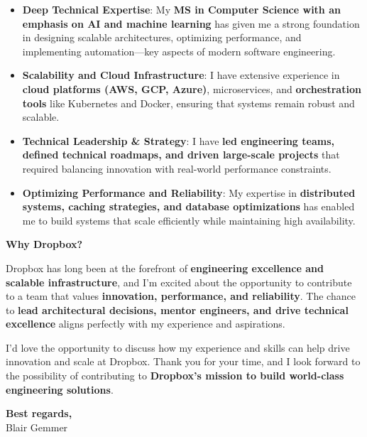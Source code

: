 \documentclass[a4paper,10.5pt]{article}
\newcommand{\applicantName}{Blair Gemmer}
\newcommand{\companyName}{Dropbox}
\begin{document}
\begin{itemize}
    \item \textbf{Deep Technical Expertise}: My \textbf{MS in Computer Science with an emphasis on AI and machine learning} has given me a strong foundation in designing scalable architectures, optimizing performance, and implementing automation—key aspects of modern software engineering.
    \item \textbf{Scalability and Cloud Infrastructure}: I have extensive experience in \textbf{cloud platforms (AWS, GCP, Azure)}, microservices, and \textbf{orchestration tools} like Kubernetes and Docker, ensuring that systems remain robust and scalable.
    \item \textbf{Technical Leadership \& Strategy}: I have \textbf{led engineering teams, defined technical roadmaps, and driven large-scale projects} that required balancing innovation with real-world performance constraints.
    \item \textbf{Optimizing Performance and Reliability}: My expertise in \textbf{distributed systems, caching strategies, and database optimizations} has enabled me to build systems that scale efficiently while maintaining high availability.
\end{itemize}

\vspace{0.5cm}

\noindent
\textbf{Why \companyName?}

\companyName{} has long been at the forefront of \textbf{engineering excellence and scalable infrastructure}, and I’m excited about the opportunity to contribute to a team that values \textbf{innovation, performance, and reliability}. The chance to \textbf{lead architectural decisions, mentor engineers, and drive technical excellence} aligns perfectly with my experience and aspirations.


\vspace{0.5cm}

I’d love the opportunity to discuss how my experience and skills can help drive innovation and scale at \companyName{}. Thank you for your time, and I look forward to the possibility of contributing to \textbf{\companyName’s mission to build world-class engineering solutions}.



\vspace{0.5cm}

\noindent
\textbf{Best regards,} \\
\applicantName
\end{document}
